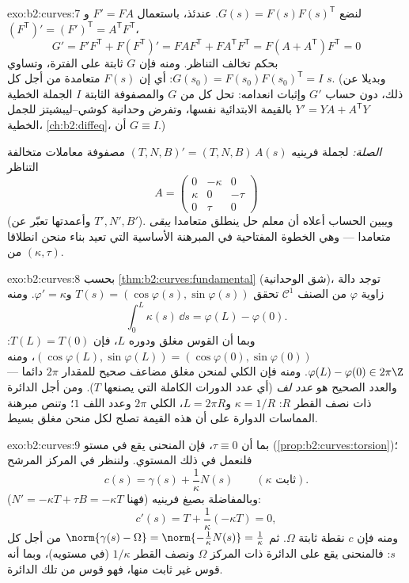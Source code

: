 \begin{solution}{exo:b2:curves:7}
لنضع $G(s) = F(s)F(s)^{\mathsf T}$. عندئذ، باستعمال $F' = FA$ و$(F^{\mathsf T})' = (F')^{\mathsf T} = A^{\mathsf T}F^{\mathsf T}$،
\[
G' = F'F^{\mathsf T} + F(F^{\mathsf T})'
= FAF^{\mathsf T} + FA^{\mathsf T}F^{\mathsf T}
= F(A + A^{\mathsf T})F^{\mathsf T} = 0
\]
بحكم تخالف التناظر. ومنه فإن $G$ ثابتة على الفترة، وتساوي $G(s_0) = F(s_0)F(s_0)^{\mathsf T} = I$:
أي إن $F(s)$ متعامدة من أجل كل $s$. (وبديلا عن ذلك، دون حساب
$G'$ وإثبات انعدامه: تحل كل من $G$ والمصفوفة الثابتة $I$
الجملة الخطية $Y' = YA +
A^{\mathsf T}Y$ بالقيمة الابتدائية نفسها، وتفرض وحدانية
كوشي--ليبشيتز للجمل الخطية، \cref{ch:b2:diffeq}، أن $G
\equiv I$.)

\emph{الصلة:} لجملة فرينيه $(T, N, B)' = (T, N, B)\,A(s)$ مصفوفة معاملات متخالفة التناظر
\[
A = \begin{pmatrix} 0 & -\kappa & 0\\ \kappa & 0 & -\tau\\
0 & \tau & 0\end{pmatrix}
\]
(وأعمدتها تعبّر عن $T', N', B'$). ويبين الحساب أعلاه أن معلم حل ينطلق
متعامدا \emph{يبقى} متعامدا --- وهي الخطوة المفتاحية في المبرهنة
الأساسية التي تعيد بناء منحن انطلاقا من $(\kappa, \tau)$.
\end{solution}

\begin{solution}{exo:b2:curves:8}
بحسب \cref{thm:b2:curves:fundamental} (شق الوحدانية)، توجد دالة زاوية $\varphi$ من الصنف $\mathcal{C}^1$
تحقق $T(s) =
(\cos\varphi(s), \sin\varphi(s))$ و$\varphi' = \kappa$. ومنه
\[
\int_0^L \kappa(s)\,\dd s = \varphi(L) - \varphi(0) .
\]
وبما أن القوس مغلق ودوره $L$، فإن $T(L) = T(0)$: $(\cos\varphi(L), \sin\varphi(L)) = (\cos\varphi(0),
\sin\varphi(0))$، ومنه $\varphi(L) - \varphi(0) \in 2\pi\Z$.
ومنه فإن  الكلي لمنحن مغلق مضاعف صحيح للمقدار $2\pi$ دائما
--- والعدد الصحيح هو \emph{عدد لف}  (أي عدد الدورات الكاملة
التي يصنعها $T$). ومن أجل الدائرة ذات نصف القطر $R$: $\kappa = 1/R$
و$L = 2\pi R$،  الكلي $2\pi$ وعدد اللف $1$؛ وتنص مبرهنة
المماسات الدوارة على أن هذه القيمة تصلح لكل منحن مغلق بسيط.
\end{solution}

\begin{solution}{exo:b2:curves:9}
بما أن $\tau \equiv 0$، فإن المنحنى يقع في مستو (\cref{prop:b2:curves:torsion})؛ فلنعمل في ذلك
المستوي. ولننظر في المركز المرشح
\[
c(s) = \gamma(s) + \frac{1}{\kappa}N(s)
\qquad (\kappa \text{ ثابت}).
\]
وبالمفاضلة بصيغ فرينيه (فهنا $N' = -\kappa T + \tau B
= -\kappa T$):
\[
c'(s) = T + \frac1\kappa(-\kappa T) = 0 ,
\]
ومنه فإن $c$ نقطة ثابتة $\Omega$. ثم $\norm{\gamma(s) -
\Omega} = \norm{-\frac1\kappa N(s)} = \frac1\kappa$ من أجل كل $s$:
فالمنحنى يقع على الدائرة ذات المركز $\Omega$ ونصف القطر $1/\kappa$ (في
مستويه)، وبما أنه قوس غير ثابت منها، فهو قوس من تلك الدائرة.
\end{solution}

